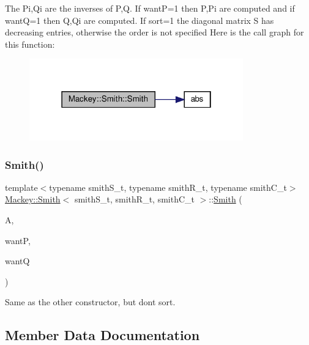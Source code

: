 The Pi,Qi are the inverses of P,Q. If wantP=1 then P,Pi are computed and if wantQ=1 then Q,Qi are computed. If sort=1 the diagonal matrix S has decreasing entries, otherwise the order is not specified Here is the call graph for this function\+:\nopagebreak
\begin{figure}[H]
\begin{center}
\leavevmode
\includegraphics[width=262pt]{classMackey_1_1Smith_a534aaf0e0b2da7d312d80ad7d67ae794_cgraph}
\end{center}
\end{figure}
\mbox{\label{classMackey_1_1Smith_a207e1221d2d15f9d9ab4ef36be67eb85}} 
\subsubsection{\texorpdfstring{Smith()}{Smith()}\hspace{0.1cm}{\footnotesize\ttfamily [2/2]}}
{\footnotesize\ttfamily template$<$typename smith\+S\+\_\+t, typename smith\+R\+\_\+t, typename smith\+C\+\_\+t$>$ \\
\hyperlink{classMackey_1_1Smith}{Mackey\+::\+Smith}$<$ smith\+S\+\_\+t, smith\+R\+\_\+t, smith\+C\+\_\+t $>$\+::\hyperlink{classMackey_1_1Smith}{Smith} (\begin{DoxyParamCaption}\item[{const smith\+S\+\_\+t \&}]{A,  }\item[{bool}]{wantP,  }\item[{bool}]{wantQ }\end{DoxyParamCaption})\hspace{0.3cm}{\ttfamily [inline]}}



Same as the other constructor, but don\textquotesingle{}t sort. 



\subsection{Member Data Documentation}
\mbox{\label{classMackey_1_1Smith_a5cd4750403fb58647adb6eaa42580e3c}} 
